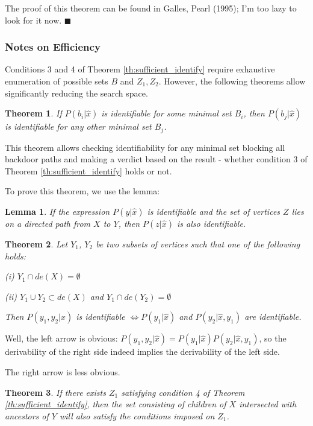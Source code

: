 \documentclass[fleqn]{article}
\newtheorem{theorem}{Theorem}
\newtheorem{lemma}{Lemma}
\numberwithin{equation}{section}
\numberwithin{theorem}{section}
\numberwithin{figure}{section}
\numberwithin{lemma}{section}
\numberwithin{corollary}{section}
\begin{document}
The proof of this theorem can be found in Galles, Pearl (1995); I'm too lazy to look for it now.
$\blacksquare$

\subsubsection*{Notes on Efficiency}

Conditions 3 and 4 of Theorem \ref{th:sufficient_identify} require exhaustive enumeration of possible sets $B$ and $Z_1, Z_2$. However, the following theorems allow significantly reducing the search space.

\begin{theorem}
	If $P(b_i|\hat x)$ is identifiable for some minimal set $B_i$, then $P(b_j|\hat x)$ is identifiable for any other minimal set $B_j$.
\end{theorem}

This theorem allows checking identifiability for any minimal set blocking all backdoor paths and making a verdict based on the result - whether condition 3 of Theorem \ref{th:sufficient_identify} holds or not.

To prove this theorem, we use the lemma:

\begin{lemma}
	If the expression $P(y|\hat x)$ is identifiable and the set of vertices $Z$ lies on a directed path from $X$ to $Y$, then $P(z|\hat x)$ is also identifiable.
\end{lemma}

\begin{theorem}
	Let $Y_1$, $Y_2$ be two subsets of vertices such that one of the following holds:
	
	(i) $Y_1 \cap de(X) = \emptyset$
	
	(ii) $Y_1 \cup Y_2 \subset de(X)$ and $Y_1 \cap de(Y_2) = \emptyset$
	
	Then $P(y_1, y_2 | \hat x)$ is identifiable $\iff P(y_1|\hat x)$ and $P(y_2|\hat x, y_1)$ are identifiable.
\end{theorem}

Well, the left arrow is obvious: $P(y_1, y_2 | \hat x) = P(y_1|\hat x)P(y_2|\hat x, y_1)$, so the derivability of the right side indeed implies the derivability of the left side.

The right arrow is less obvious.

\begin{theorem}
	If there exists $Z_1$ satisfying condition 4 of Theorem \ref{th:sufficient_identify}, then the set consisting of children of $X$ intersected with ancestors of $Y$ will also satisfy the conditions imposed on $Z_1$. 
\end{theorem}
\end{document}
